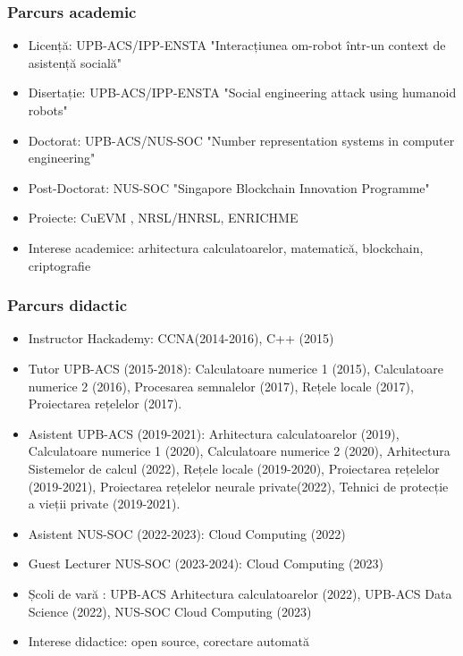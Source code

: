 
\begin{frame}
    \frametitle{Parcurs academic}
    \begin{itemize}
        \item Licență: UPB-ACS/IPP-ENSTA "Interacțiunea om-robot într-un context de asistență socială"
        \item Disertație: UPB-ACS/IPP-ENSTA "Social engineering attack using humanoid robots"
        \item Doctorat: UPB-ACS/NUS-SOC "Number representation systems in computer engineering"
        \item Post-Doctorat: NUS-SOC "Singapore Blockchain Innovation Programme"
        \item Proiecte: CuEVM \footnotemark[1], NRSL/HNRSL, ENRICHME
        \item Interese academice: arhitectura calculatoarelor, matematică, blockchain, criptografie
    \end{itemize}
    \note{
    }
\end{frame}

\begin{frame}
    \frametitle{Parcurs didactic}
    \begin{itemize}
        \item Instructor Hackademy: CCNA(2014-2016), C++ (2015)
        \item Tutor UPB-ACS (2015-2018): Calculatoare numerice 1 (2015), Calculatoare numerice 2 (2016), Procesarea semnalelor (2017), Rețele locale (2017), Proiectarea rețelelor (2017).
        \item Asistent UPB-ACS (2019-2021): Arhitectura calculatoarelor (2019), Calculatoare numerice 1 (2020), Calculatoare numerice 2 (2020), Arhitectura Sistemelor de calcul (2022),  Rețele locale (2019-2020), Proiectarea rețelelor (2019-2021), Proiectarea rețelelor neurale private(2022), Tehnici de protecție a vieții private (2019-2021).
        \item Asistent NUS-SOC (2022-2023): Cloud Computing (2022)
        \item Guest Lecturer NUS-SOC (2023-2024): Cloud Computing (2023)
        \item Școli de vară : UPB-ACS Arhitectura calculatoarelor (2022), UPB-ACS Data Science (2022), NUS-SOC Cloud Computing (2023)
        \item Interese didactice: open source, corectare automată
    \end{itemize}
    \note{
    }
\end{frame}

